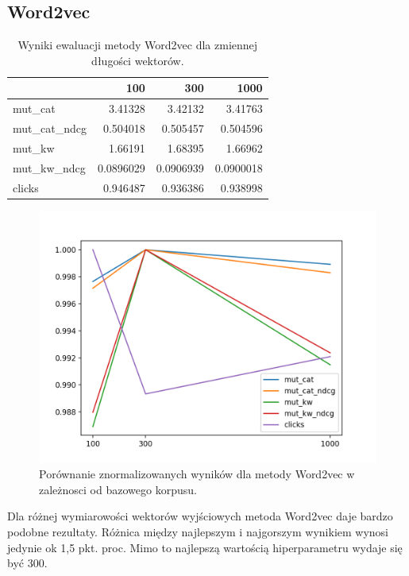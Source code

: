 \documentclass[pl]{minipw} %
\begin{document}
\subsection{Word2vec}

\begin{table}
	\centering
	\begin{tabular}{lrrr}
		\hline
		&       100 &       300 &      1000 \\
		\hline
		mut\_cat      & 3.41328   & 3.42132   & 3.41763   \\
		mut\_cat\_ndcg & 0.504018  & 0.505457  & 0.504596  \\
		mut\_kw       & 1.66191   & 1.68395   & 1.66962   \\
		mut\_kw\_ndcg  & 0.0896029 & 0.0906939 & 0.0900018 \\
		clicks       & 0.946487  & 0.936386  & 0.938998  \\
		\hline
	\end{tabular}
	\caption{Wyniki ewaluacji metody Word2vec dla zmiennej długości wektorów.}
\end{table}

\begin{figure}[H]
	\centering
	\includegraphics[width=1\textwidth]{img/results/w2v_ctr.png}
	\caption{Porównanie znormalizowanych wyników dla metody Word2vec w zależnosci od bazowego korpusu.}
\end{figure}

Dla różnej wymiarowości wektorów wyjściowych metoda Word2vec daje bardzo podobne rezultaty. Różnica między najlepszym i najgorszym wynikiem wynosi jedynie ok 1,5 pkt. proc. Mimo to najlepszą wartością hiperparametru wydaje się być 300.
\end{document}

